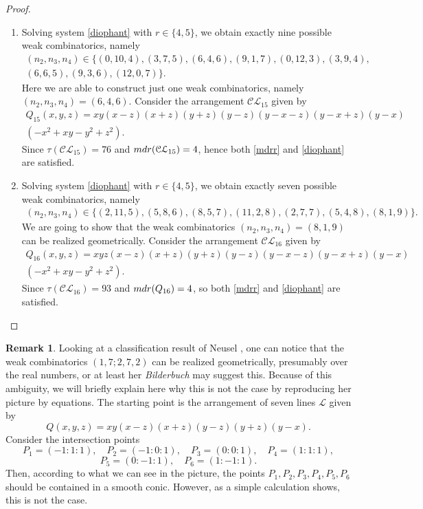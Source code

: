\documentclass[12pt]{article}
\theoremstyle{plain}
\theoremstyle{definition}
\newtheorem{remark}[thm]{Remark}
\begin{document}
\begin{proof}
\begin{enumerate}
    Finally, we look at the third weak combinatorics. Consider the arrangement $\mathcal{CL}_{14}$ given by 
    $$Q_{14}(x,y,z) = xy(x+z)(x-z)(y-z)(y+z)(y-x)(y+x)(3x^{2}+y^{2}-4z^{2}).$$ We can check that $(n_{2}, n_{3}, n_{4}) = (8,2,5)$, so we have $\tau(\mathcal{CL}_{14})=61$, and ${\rm mdr}(Q_{14})=4$, so both \eqref{mdrr} and \eqref{diophant} are satisfied.
     \item[($d=9$):] Solving system \eqref{diophant} with $r \in \{4,5\}$, we obtain exactly nine possible weak combinatorics, namely 
     \begin{multline*}
        (n_{2},n_{3},n_{4}) \in \{(0,10,4),(3,7,5),(6,4,6),(9,1,7),(0,12,3),(3,9,4),\\ (6,6,5),(9,3,6),(12,0,7) \}.
     \end{multline*}
Here we are able to construct just one weak combinatorics, namely $(n_{2},n_{3},n_{4}) = (6,4,6)$. Consider the arrangement $\mathcal{CL}_{15}$ given by
\begin{multline*}
Q_{15}(x,y,z) = xy(x-z)(x+z)(y+z)(y-z)(y-x-z)(y-x+z)(y-x) \\ (-x^{2}+xy-y^{2}+z^{2}).
\end{multline*}
Since $\tau(\mathcal{CL}_{15})=76$ and ${\rm mdr}(\mathcal{CL}_{15})=4$, hence both \eqref{mdrr} and \eqref{diophant} are satisfied.
\item[($d=10$):] Solving system \eqref{diophant} with $r \in \{4,5\}$, we obtain exactly seven possible weak combinatorics, namely 
     \begin{multline*}
        (n_{2},n_{3},n_{4}) \in \{(2,11,5),(5,8,6),(8,5,7),(11,2,8),(2,7,7),(5,4,8),(8,1,9)\}.
        \end{multline*}
        We are going to show that the weak combinatorics $(n_{2},n_{3},n_{4})=(8,1,9)$ can be realized geometrically. Consider the arrangement $\mathcal{CL}_{16}$ given by 
\begin{multline*}
    Q_{16}(x,y,z) = xyz(x-z)(x+z)(y+z)(y-z)(y-x-z)(y-x+z)(y-x) \\ (-x^{2}+xy-y^{2}+z^{2}).
\end{multline*}
Since
$\tau(\mathcal{CL}_{16})=93$ and ${\rm mdr}(Q_{16})=4$, so both \eqref{mdrr} and \eqref{diophant} are satisfied.
\end{enumerate}
\end{proof}
\begin{remark}
Looking at a classification result of Neusel \cite{neusel}, one can notice that the weak combinatorics $(1,7;2,7,2)$ can be realized geometrically, presumably over the real numbers, or at least her \textit{Bilderbuch} may suggest this. Because of this ambiguity, we will briefly explain here why this is not the case by reproducing her picture by equations. The starting point is the arrangement of seven lines $\mathcal{L}$ given by
$$Q(x,y,z)=xy(x-z)(x+z)(y-z)(y+z)(y-x).$$
Consider the intersection points 
$$P_{1} = (-1:1:1),\quad  P_{2} = (-1:0:1), \quad P_{3}=(0:0:1), \quad P_{4}=(1:1:1), $$
$$P_{5}=(0:-1:1), \quad P_{6}=(1:-1:1).$$
Then, according to what we can see in the picture, the points $P_{1},P_{2},P_{3},P_{4},P_{5},P_{6}$ should be contained in a smooth conic. However, as a simple calculation shows, this is not the case.
\end{remark}
\end{document}
